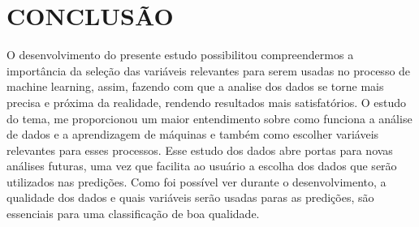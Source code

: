 \section{CONCLUSÃO}
O desenvolvimento do presente estudo possibilitou compreendermos a importância da seleção das variáveis relevantes para serem usadas no processo de machine learning, assim, fazendo com que a analise dos dados se torne mais precisa e próxima da realidade, rendendo resultados mais satisfatórios. O estudo do tema, me proporcionou um maior entendimento sobre como funciona a análise de dados e a aprendizagem de máquinas e também como escolher variáveis relevantes para esses processos. Esse estudo dos dados abre portas para novas análises futuras, uma vez que facilita ao usuário a escolha dos dados que serão utilizados nas predições. Como foi possível ver durante o desenvolvimento, a qualidade dos dados e quais variáveis serão usadas paras as predições, são essenciais para uma classificação de boa qualidade.